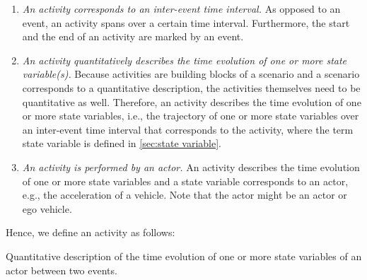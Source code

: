 \begin{enumerate}
	\item\textit{An activity corresponds to an inter-event time interval.}
	As opposed to an event, an activity spans over a certain time interval. Furthermore, the start and the end of an activity are marked by an event.
	
	\item\textit{An activity quantitatively describes the time evolution of \cstarte one or more \cende state variable\cstarte(s)\cende.}
	Because activities are building blocks of a scenario and a scenario corresponds to a quantitative description, the activities themselves need to be quantitative as well. 
	Therefore, an activity describes the time evolution of one or more state variables, i.e., the trajectory of one or more state variables over an inter-event time interval that corresponds to the activity, where the term state variable is defined in \cref{sec:state variable}.
	
	\item\textit{An activity is performed by an actor.}
	An activity describes the time evolution of one or more state variables and a state variable corresponds to an actor, e.g., the acceleration of a vehicle. Note that the actor might be an actor or ego vehicle. 
\end{enumerate}

Hence, we define an activity as follows:
\begin{definition}[Activity]
	\label{def:activity}
	Quantitative description of the time evolution of one or more state variables of an actor between two events.
\end{definition}




